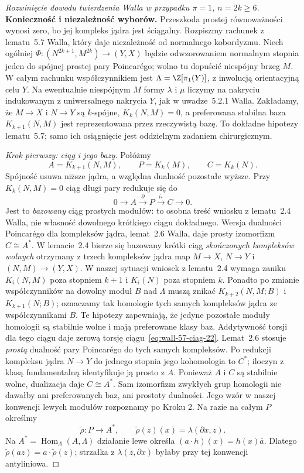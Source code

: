 \begin{proof}[Rozwinięcie dowodu twierdzenia Walla w przypadku
 $\pi=1$, $n=2k\geq6$]
\textbf{Konieczność i niezależność wyborów.}
Przeszkoda prostej równoważności wynosi
zero, bo jej kompleks jądra jest ściągalny.
Rozpiszmy rachunek z lematu~5.7 Walla,
który daje niezależność od normalnego
kobordyzmu. Niech ogólniej
$\Phi:(N^{2k+1},M^{2k})\to(Y,X)$ będzie
odwzorowaniem normalnym stopnia jeden
do spójnej prostej pary Poincarégo; wolno
tu dopuścić niespójny brzeg $M$.
W całym rachunku współczynnikiem jest
$\Lambda=\Z[\pi_1(Y)]$, z inwolucją
orientacyjną celu $Y$. Na ewentualnie
niespójnym $M$ formy
$\lambda$ i $\mu$ liczymy na nakryciu
indukowanym z uniwersalnego nakrycia $Y$,
jak w uwadze~5.2.1 Walla. Zakładamy,
że $M\to X$ i $N\to Y$ są $k$-spójne,
$K_k(N,M)=0$, a preferowana stabilna baza
$K_{k+1}(N,M)$ jest reprezentowana przez
rzeczywistą bazę. To dokładne hipotezy
lematu~5.7; samo ich osiągnięcie jest
oddzielnym zadaniem chirurgicznym.

\emph{Krok pierwszy: ciąg i jego bazy.}
Połóżmy
\[
 A=K_{k+1}(N,M),\qquad P=K_k(M),
 \qquad C=K_k(N).
\]
Spójność usuwa niższe jądra, a względna
dualność pozostałe wyższe. Przy
$K_k(N,M)=0$ ciąg długi pary redukuje się do
\begin{equation}\label{eq:wall-57-ciag-22}
 0\longrightarrow A\xrightarrow{\,\partial\,}P
 \xrightarrow{\,i_*\,}C\longrightarrow0.
\end{equation}
Jest to \emph{bazowany} ciąg prostych modułów:
to osobna treść wniosku z lematu~2.4 Walla,
nie własność dowolnego krótkiego ciągu
dokładnego. Wersja dualności Poincarégo
dla kompleksów jądra, lemat~2.6 Walla,
daje prosty izomorfizm $C\cong A^*$.
W lemacie~2.4 bierze się bazowany krótki ciąg
\emph{skończonych kompleksów wolnych} otrzymany
z trzech kompleksów jądra map $M\to X$,
$N\to Y$ i $(N,M)\to(Y,X)$. W naszej sytuacji
wniosek z lematu~2.4 wymaga zaniku
$K_i(N,M)$ poza stopniem $k+1$ i $K_i(N)$
poza stopniem $k$. Ponadto po zmianie
współczynników na dowolny moduł $B$ nad
$\Lambda$ muszą znikać
$K_{k+2}(N,M;B)$ i $K_{k+1}(N;B)$;
oznaczamy tak homologie tych samych
kompleksów jądra ze współczynnikami $B$.
Te hipotezy
zapewniają, że jedyne pozostałe moduły homologii
są stabilnie wolne i mają preferowane klasy baz.
Addytywność torsji dla tego ciągu daje zerową
torsję ciągu~\eqref{eq:wall-57-ciag-22}.
Lemat~2.6 stosuje \emph{prostą} dualność pary
Poincarégo do tych samych kompleksów. Po
redukcji kompleksu jądra $N\to Y$ do jednego
stopnia jego kohomologia to $C^*$; iloczyn
z klasą fundamentalną identyfikuje ją prosto
z $A$. Ponieważ $A$ i $C$ są stabilnie wolne,
dualizacja daje $C\cong A^*$.
Sam
izomorfizm zwykłych grup homologii nie dawałby
ani preferowanych baz, ani prostoty dualności.
Jego wzór w naszej konwencji lewych
modułów rozpoznamy po Kroku 2. Na razie
na całym $P$ określmy
\[
 \widetilde\rho:P\longrightarrow A^*,
 \qquad \widetilde\rho(z)(x)=\lambda(\partial x,z).
\]
Na $A^*=\operatorname{Hom}_\Lambda(A,\Lambda)$
działanie lewe określa
$(a\cdot h)(x)=h(x)\bar a$.
Dlatego $\widetilde\rho(az)=a\cdot
\widetilde\rho(z)$;
strzałka z $\lambda(z,\partial x)$
byłaby przy tej konwencji antyliniowa.


\end{proof}
